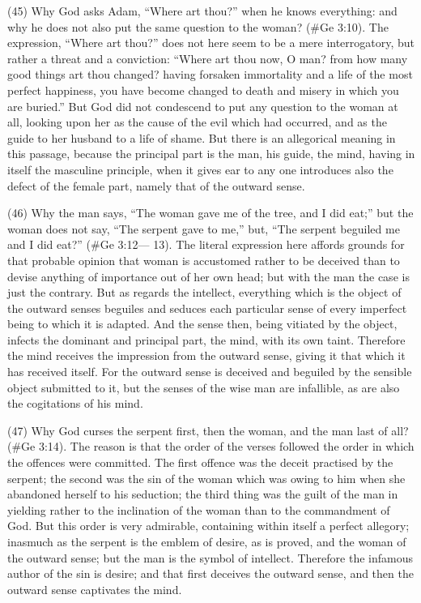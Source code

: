 (45) Why God asks Adam, ``Where art thou?'' when he knows everything: and why he does not
also put the same question to the woman? (\#Ge 3:10). The expression, ``Where art thou?''
does not here seem to be a mere interrogatory, but rather a threat and a conviction: ``Where art
thou now, O man? from how many good things art thou changed? having forsaken immortality and
a life of the most perfect happiness, you have become changed to death and misery in which you
are buried.'' But God did not condescend to put any question to the woman at all, looking upon her
as the cause of the evil which had occurred, and as the guide to her husband to a life of shame.
But there is an allegorical meaning in this passage, because the principal part is the man, his
guide, the mind, having in itself the masculine principle, when it gives ear to any one introduces
also the defect of the female part, namely that of the outward sense.

(46) Why the man says, ``The woman gave me of the tree, and I did eat;'' but the woman does not
say, ``The serpent gave to me,'' but, ``The serpent beguiled me and I did eat?'' (\#Ge 3:12— 13).
The literal expression here affords grounds for that probable opinion that woman is accustomed
rather to be deceived than to devise anything of importance out of her own head; but with the man
the case is just the contrary. But as regards the intellect, everything which is the object of the
outward senses beguiles and seduces each particular sense of every imperfect being to which it is
adapted. And the sense then, being vitiated by the object, infects the dominant and principal part,
the mind, with its own taint. Therefore the mind receives the impression from the outward sense,
giving it that which it has received itself. For the outward sense is deceived and beguiled by the
sensible object submitted to it, but the senses of the wise man are infallible, as are also the
cogitations of his mind.

(47) Why God curses the serpent first, then the woman, and the man last of all? (\#Ge 3:14).
The reason is that the order of the verses followed the order in which the offences were
committed. The first offence was the deceit practised by the serpent; the second was the sin of the
woman which was owing to him when she abandoned herself to his seduction; the third thing was
the guilt of the man in yielding rather to the inclination of the woman than to the commandment of
God. But this order is very admirable, containing within itself a perfect allegory; inasmuch as the
serpent is the emblem of desire, as is proved, and the woman of the outward sense; but the man is
the symbol of intellect. Therefore the infamous author of the sin is desire; and that first deceives
the outward sense, and then the outward sense captivates the mind.

